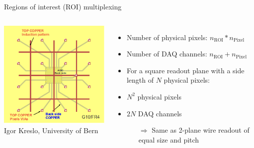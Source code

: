 \documentclass[]{beamer}
\newcommand*{\m}{\mathrm}
\newcommand*{\emphcol}{blue}
\begin{document}
\begin{frame}{Regions of interest (ROI) multiplexing}
	\begin{columns}[c]
		\centering
		\includegraphics[width=\textwidth]{defence/roi}\\
		{\tiny Igor Kreslo, University of Bern}\\
		\begin{itemize}
			\item Number of physical pixels: {\color{\emphcol} $n_{\m{ROI}} * n_{\m{Pixel}}$}
			\item Number of DAQ channels: {\color{\emphcol} $n_{\m{ROI}} + n_{\m{Pixel}}$}
			\item For a square readout plane with a side length of $N$ physical pixels:
			\item $N ^ 2$ physical pixels
			\item $2 N$ DAQ channels
			\begin{itemize}
				\item[$\Rightarrow$] Same as 2-plane wire readout of equal size and pitch
			\end{itemize}
		\end{itemize}
	\end{columns}
\end{frame}
\end{document}
